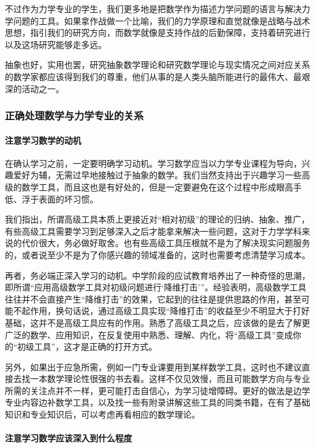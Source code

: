 不过作为力学专业的学生，我们更多地是把数学作为描述力学问题的语言与解决力学问题的工具。如果拿作战做一个比喻，我们的力学原理和直觉就像是战略与战术思想，指引我们的研究方向，而数学就像是支持作战的后勤保障，支持着研究进行以及这场研究能够走多远。

抽象也好，实用也罢，研究抽象数学理论和研究数学理论与现实情况之间对应关系的数学家都应该得到我们的尊重，他们从事的是人类头脑所能进行的最伟大、最艰深的活动之一。

\subsubsection{正确处理数学与力学专业的关系}

\paragraph{注意学习数学的动机}

在确认学习之前，一定要明确学习动机。学习数学应当以力学专业课程为导向，兴趣爱好为辅，无需过早地接触过于抽象的数学。我们当然支持出于兴趣学习一些高级的数学工具，而且这也是有好处的，但是一定要避免在这个过程中形成眼高手低、浮于表面的坏习惯。

我们指出，所谓高级工具本质上更接近对“相对初级”的理论的归纳、抽象、推广，有些高级工具需要学习到足够深入之后才能拿来解决一些问题，这对于力学学科来说的代价很大，务必做好取舍。也有些高级工具压根就不是为了解决现实问题服务的，或者说至少不是为了你感兴趣的领域准备的，这时也需要考虑清楚学习成本。

再者，务必端正深入学习的动机。中学阶段的应试教育培养出了一种奇怪的思潮，即所谓“应用高级数学工具对初级问题进行‘降维打击’”。经验表明，高级数学工具往往并不会直接产生“降维打击”的效果，它起到的往往是提供思路的作用，甚至可能不起作用，换句话说，通过高级工具实现“降维打击”的收益至少不明显大于打好基础，这并不是高级工具应有的作用。熟悉了高级工具之后，应该做的是去了解更广泛的数学、应用知识，在反复使用中熟悉、理解、内化，将“高级工具”变成你的“初级工具”，这才是正确的打开方式。

另外，如果出于应急所需，例如一门专业课要用到某样数学工具，这时也不建议直接去找一本数学理论性很强的书去看。这样不仅见效慢，而且可能数学方向与专业所需的关注点并不一样，更可能打击自信心，为学习徒增障碍。更好的做法是边学专业内容边补数学工具，以及找一些有附录讲解这些工具的同类书籍，在有了基础知识和专业知识后，可以考虑再看相应的数学理论。

\paragraph{注意学习数学应该深入到什么程度}

